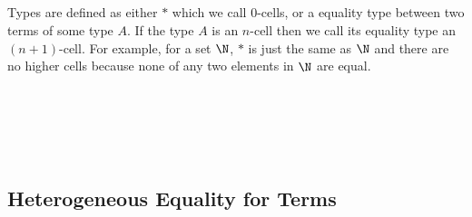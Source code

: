 \begin{code}\>\<%
\\
\>  \<%
\\
\>[0]\<[2]%
\>[2] \<[8]%
\>[8]\AgdaSymbol{:} \<%
\\
\>[0]\<[2]%
\>[2]\AgdaInductiveConstructor{\_,\_} \<[8]%
\>[8]\AgdaSymbol{:} \AgdaSymbol{(} \AgdaSymbol{:} \AgdaSymbol{)(} \AgdaSymbol{:}  \AgdaSymbol{)}  \<%
\\
\>\<\end{code}
Types are defined as either $*$ which we
call $0$-cells, or a equality type between two terms of some type $A$. If the
type $A$ is an $n$-cell then we call its equality type an $(n+1)$-cell. For example, for a set $\N$, $*$ is just the same as $\N$ and there are no higher cells because none of any two elements in $\N$ are equal. 

\begin{code}\>\<%
\\
\>   \<%
\\
\>[0]\<[2]%
\>[2]\AgdaInductiveConstructor{*} \<[8]%
\>[8]\AgdaSymbol{:}  \<%
\\
\>[0]\<[2]%
\>[2] \<[8]%
\>[8]\AgdaSymbol{:} \AgdaSymbol{\{} \AgdaSymbol{:}  \AgdaSymbol{\}(}  \AgdaSymbol{:}  \AgdaSymbol{)}   \<%
\\
\>\<\end{code}

\subsection{Heterogeneous Equality for Terms}\label{sec:het}

